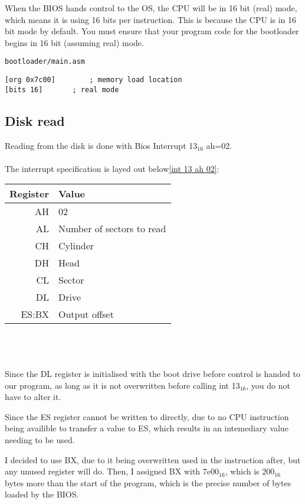\documentclass{article}
\begin{document}
When the BIOS hands control to the OS, the CPU will be in 16 bit (real) mode\cite{16bitstart},
which means it is using 16 bits per instruction. This is because the CPU is in
16 bit mode by default. You must ensure that your program code for the bootloader
begins in 16 bit (assuming real) mode.

\begin{verbatim}
bootloader/main.asm
\end{verbatim}
\begin{verbatim}
[org 0x7c00]		; memory load location
[bits 16]		; real mode
\end{verbatim}

\subsection{Disk read}

Reading from the disk is done with Bios Interrupt 13$_{16}$ ah=02\cite{int 13h}.
\\\\
The interrupt specification is layed out below\ref{int 13 ah 02}:
\\

\begin{tabular}{|r|l|}
	\hline
	\textbf{Register} & \textbf{Value} \\
	\hline
	AH & 02 \\
	\hline
	AL & Number of sectors to read \\
	\hline
	CH & Cylinder \\
	\hline
	DH & Head \\
	\hline
	CL & Sector \\
	\hline
	DL & Drive \\
	\hline
	ES:BX & Output offset \\
	\hline
\end{tabular}
\\\\\\
Since the DL register is initialised with the boot drive before control
is handed to our program\cite{boot drive init}, as long as it is not
overwritten before calling int 13$_{16}$, you do not have to alter it.

Since the ES register cannot be written to directly, due to no CPU instruction
being availible to transfer a value to ES\cite{segment cpu write instruction},
which results in an intemediary value needing to be used.

I decided to use BX, due to it being overwritten used in the instruction after,
but any unused register will do. Then, I assigned BX with 7e00$_{16}$, which is
$200_{16}$ bytes more than the start of the program\cite{7c00}, which is the
precise number of bytes loaded by the BIOS\cite{sector size}.
\end{document}
